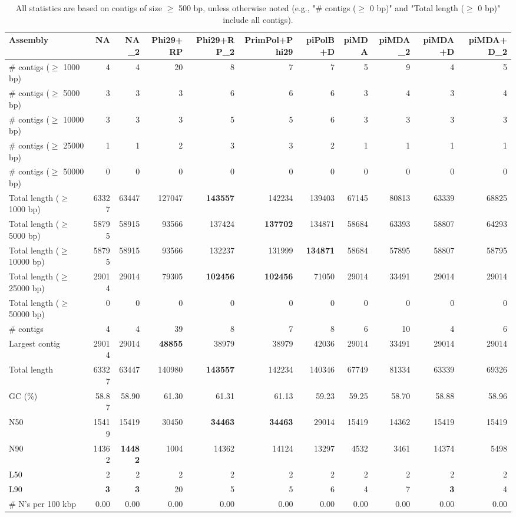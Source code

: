 \documentclass[12pt,a4paper]{article}
\begin{document}
\begin{table}[ht]
\begin{center}
\caption{All statistics are based on contigs of size $\geq$ 500 bp, unless otherwise noted (e.g., "\# contigs ($\geq$ 0 bp)" and "Total length ($\geq$ 0 bp)" include all contigs).}
\begin{tabular}{|l*{10}{|r}|}
\hline
Assembly & NA & NA\_2 & Phi29+RP & Phi29+RP\_2 & PrimPol+Phi29 & piPolB+D & piMDA & piMDA\_2 & piMDA+D & piMDA+D\_2 \\ \hline
\# contigs ($\geq$ 1000 bp) & 4 & 4 & 20 & 8 & 7 & 7 & 5 & 9 & 4 & 5 \\ \hline
\# contigs ($\geq$ 5000 bp) & 3 & 3 & 3 & 6 & 6 & 6 & 3 & 4 & 3 & 4 \\ \hline
\# contigs ($\geq$ 10000 bp) & 3 & 3 & 3 & 5 & 5 & 6 & 3 & 3 & 3 & 3 \\ \hline
\# contigs ($\geq$ 25000 bp) & 1 & 1 & 2 & 3 & 3 & 2 & 1 & 1 & 1 & 1 \\ \hline
\# contigs ($\geq$ 50000 bp) & 0 & 0 & 0 & 0 & 0 & 0 & 0 & 0 & 0 & 0 \\ \hline
Total length ($\geq$ 1000 bp) & 63327 & 63447 & 127047 & {\bf 143557} & 142234 & 139403 & 67145 & 80813 & 63339 & 68825 \\ \hline
Total length ($\geq$ 5000 bp) & 58795 & 58915 & 93566 & 137424 & {\bf 137702} & 134871 & 58684 & 63393 & 58807 & 64293 \\ \hline
Total length ($\geq$ 10000 bp) & 58795 & 58915 & 93566 & 132237 & 131999 & {\bf 134871} & 58684 & 57895 & 58807 & 58795 \\ \hline
Total length ($\geq$ 25000 bp) & 29014 & 29014 & 79305 & {\bf 102456} & {\bf 102456} & 71050 & 29014 & 33491 & 29014 & 29014 \\ \hline
Total length ($\geq$ 50000 bp) & 0 & 0 & 0 & 0 & 0 & 0 & 0 & 0 & 0 & 0 \\ \hline
\# contigs & 4 & 4 & 39 & 8 & 7 & 8 & 6 & 10 & 4 & 6 \\ \hline
Largest contig & 29014 & 29014 & {\bf 48855} & 38979 & 38979 & 42036 & 29014 & 33491 & 29014 & 29014 \\ \hline
Total length & 63327 & 63447 & 140980 & {\bf 143557} & 142234 & 140346 & 67749 & 81334 & 63339 & 69326 \\ \hline
GC (\%) & 58.87 & 58.90 & 61.30 & 61.31 & 61.13 & 59.23 & 59.25 & 58.70 & 58.88 & 58.96 \\ \hline
N50 & 15419 & 15419 & 30450 & {\bf 34463} & {\bf 34463} & 29014 & 15419 & 14362 & 15419 & 15419 \\ \hline
N90 & 14362 & {\bf 14482} & 1004 & 14362 & 14124 & 13297 & 4532 & 3461 & 14374 & 5498 \\ \hline
L50 & 2 & 2 & 2 & 2 & 2 & 2 & 2 & 2 & 2 & 2 \\ \hline
L90 & {\bf 3} & {\bf 3} & 20 & 5 & 5 & 6 & 4 & 7 & {\bf 3} & 4 \\ \hline
\# N's per 100 kbp & 0.00 & 0.00 & 0.00 & 0.00 & 0.00 & 0.00 & 0.00 & 0.00 & 0.00 & 0.00 \\ \hline
\end{tabular}
\end{center}
\end{table}
\end{document}
